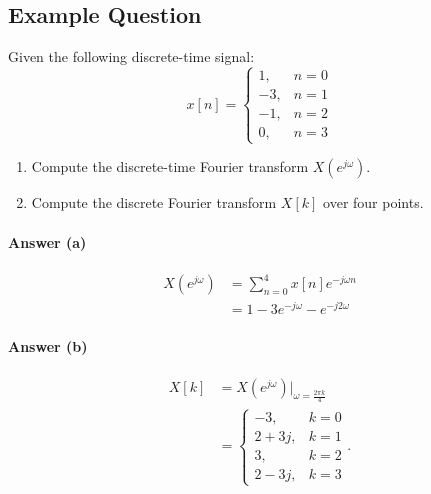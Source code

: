 \subsection{Example Question}
\begin{q}{}
    Given the following discrete-time signal:
    \[
        x[n] = 
        \begin{cases}
            1, & n=0 \\
            -3, & n=1 \\
            -1, & n=2 \\
            0, & n=3
        \end{cases}
    \]
    \begin{enumerate}[label=(\alph*)]
        \item Compute the discrete-time Fourier transform $X(e^{j\omega})$.
        \item Compute the discrete Fourier transform $X[k]$ over four points.
    \end{enumerate}
    {\color{blue}
        \paragraph{Answer (a)}
        \begin{align*}
            X(e^{j\omega}) 
            & = \sum_{n=0}^{4} x[n] e^{-j\omega n} \\
            & = 1 - 3e^{-j\omega} - e^{-j2\omega}
        \end{align*}
    }
    {\color{blue}
        \paragraph{Answer (b)}
        \begin{align*}
            X[k] 
            & = X(e^{j\omega})\lvert_{\omega = \frac{2\pi k}{4}} \\
            & = \begin{cases}
                -3, & k = 0\\
                2+3j, & k = 1\\
                3, & k=2 \\
                2-3j, & k=3
            \end{cases}.
        \end{align*}
    }
\end{q}





